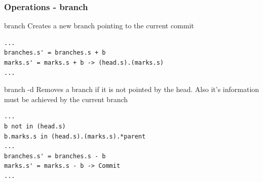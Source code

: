 \documentclass{beamer}
\begin{document}
\begin{frame}[fragile]
   \frametitle{Operations - branch}
   \begin{block}{branch}
      Creates a new branch pointing to the current commit
   \end{block}
   \tiny
   \begin{lstlisting}
...
branches.s' = branches.s + b
marks.s' = marks.s + b -> (head.s).(marks.s)
...
   \end{lstlisting}
   \normalsize
   \begin{block}{branch -d}
      Removes a branch if it is not pointed by the head.
      Also it's information must be achieved by the 
      current branch
   \end{block}
   \tiny
   \begin{lstlisting}
...
b not in (head.s)
b.marks.s in (head.s).(marks.s).*parent
...
branches.s' = branches.s - b
marks.s' = marks.s - b -> Commit
...
   \end{lstlisting}
\end{frame}
\end{document}
